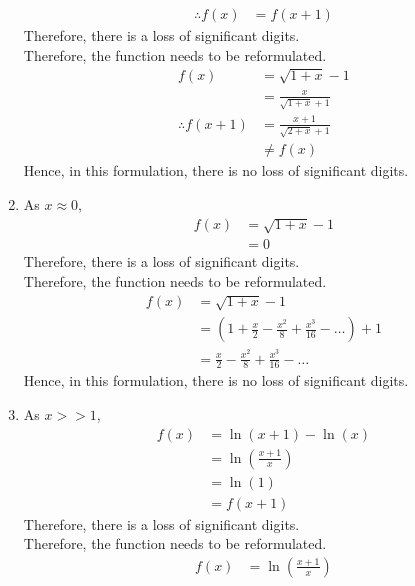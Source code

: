 \documentclass[fleqn, a4paper, 11pt, oneside]{amsart}
\theoremstyle{definition}
\theoremstyle{theorem}
\begin{document}
\begin{solution}
\begin{enumerate}[leftmargin=*]
\begin{align*}
				\therefore f(x) & = f(x + 1)
			\end{align*}
			Therefore, there is a loss of significant digits.\\
			Therefore, the function needs to be reformulated.
			\begin{align*}
				f(x)                & = \sqrt{1 + x} - 1               \\
                                                    & = \frac{x}{\sqrt{1 + x} + 1}     \\
				\therefore f(x + 1) & = \frac{x + 1}{\sqrt{2 + x} + 1} \\
                                                    & \neq f(x)
			\end{align*}
			Hence, in this formulation, there is no loss of significant digits.
		\item
			As $x \approx 0$,
			\begin{align*}
				f(x) & = \sqrt{1 + x} - 1 \\
                                     & = 0
			\end{align*}
			Therefore, there is a loss of significant digits.\\
			Therefore, the function needs to be reformulated.
			\begin{align*}
				f(x) & = \sqrt{1 + x} - 1                                                            \\
                                     & = \left( 1 + \frac{x}{2} - \frac{x^2}{8} + \frac{x^3}{16} - \dots \right) + 1 \\
                                     & = \frac{x}{2} - \frac{x^2}{8} + \frac{x^3}{16} - \dots
			\end{align*}
			Hence, in this formulation, there is no loss of significant digits.
		\item
			As $x >> 1$,
			\begin{align*}
				f(x) & = \ln(x + 1) - \ln(x)               \\
                                     & = \ln\left( \frac{x + 1}{x} \right) \\
                                     & = \ln(1)                            \\
                                     & = f(x + 1)
			\end{align*}
			Therefore, there is a loss of significant digits.\\
			Therefore, the function needs to be reformulated.
			\begin{align*}
				f(x) & = \ln\left( \frac{x + 1}{x} \right) \\

\end{align*}
\end{enumerate}
\end{solution}
\end{document}
